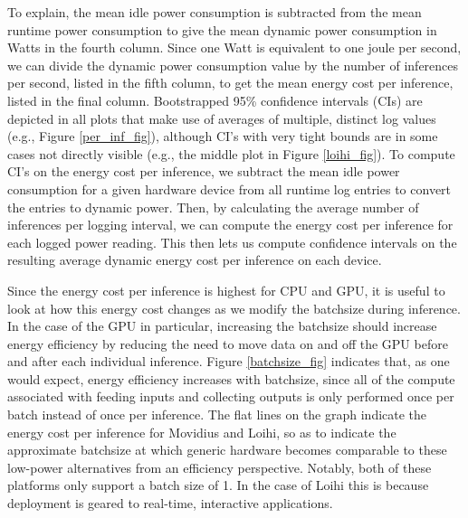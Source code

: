 \documentclass[sigconf, screen]{acmart}
\begin{document}
To explain, the mean idle power consumption is subtracted from the mean runtime power consumption to give the mean dynamic power consumption in Watts in the fourth column. Since one Watt is equivalent to one joule per second, we can divide the dynamic power consumption value by the number of inferences per second, listed in the fifth column, to get the mean energy cost per inference, listed in the final column. Bootstrapped 95\% confidence intervals (CIs) are depicted in all plots that make use of averages of multiple, distinct log values (e.g., Figure \ref{per_inf_fig}), although CI's with very tight bounds are in some cases not directly visible (e.g., the middle plot in Figure \ref{loihi_fig}). To compute CI's on the energy cost per inference, we subtract the mean idle power consumption for a given hardware device from all runtime log entries to convert the entries to dynamic power. Then, by calculating the average number of inferences per logging interval, we can compute the energy cost per inference for each logged power reading. This then lets us compute confidence intervals on the resulting average dynamic energy cost per inference on each device.

Since the energy cost per inference is highest for CPU and GPU, it is useful to look at how this energy cost changes as we modify the batchsize during inference. In the case of the GPU in particular, increasing the batchsize should increase energy efficiency by reducing the need to move data on and off the GPU before and after each individual inference. Figure \ref{batchsize_fig} indicates that, as one would expect, energy efficiency increases with batchsize, since all of the compute associated with feeding inputs and collecting outputs is only performed once per batch instead of once per inference. The flat lines on the graph indicate the energy cost per inference for Movidius and Loihi, so as to indicate the approximate batchsize at which generic hardware becomes comparable to these low-power alternatives from an efficiency perspective. Notably, both of these platforms only support a batch size of 1. In the case of Loihi this is because deployment is geared to real-time, interactive applications.
\end{document}
